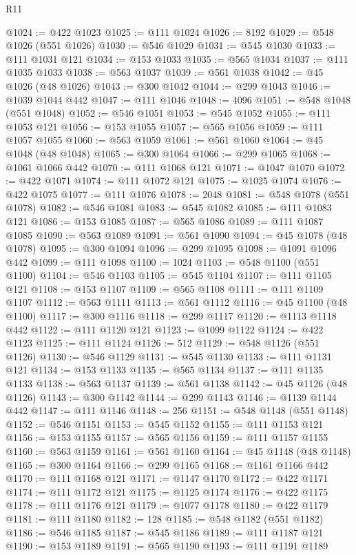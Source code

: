 \begin{lexlean}{R11}
\begin{coremodule}
@1024 := @422 @1023
@1025 := @111 @1024
@1026 := 8192
@1029 := @548 @1026 (@551 @1026)
@1030 := @546 @1029
@1031 := @545 @1030
@1033 := @111 @1031 @121
@1034 := @153 @1033
@1035 := @565 @1034
@1037 := @111 @1035 @1033
@1038 := @563 @1037
@1039 := @561 @1038
@1042 := @45 @1026 (@48 @1026)
@1043 := @300 @1042
@1044 := @299 @1043
@1046 := @1039 @1044 @442
@1047 := @111 @1046
@1048 := 4096
@1051 := @548 @1048 (@551 @1048)
@1052 := @546 @1051
@1053 := @545 @1052
@1055 := @111 @1053 @121
@1056 := @153 @1055
@1057 := @565 @1056
@1059 := @111 @1057 @1055
@1060 := @563 @1059
@1061 := @561 @1060
@1064 := @45 @1048 (@48 @1048)
@1065 := @300 @1064
@1066 := @299 @1065
@1068 := @1061 @1066 @442
@1070 := @111 @1068 @121
@1071 := @1047 @1070
@1072 := @422 @1071
@1074 := @111 @1072 @121
@1075 := @1025 @1074
@1076 := @422 @1075
@1077 := @111 @1076
@1078 := 2048
@1081 := @548 @1078 (@551 @1078)
@1082 := @546 @1081
@1083 := @545 @1082
@1085 := @111 @1083 @121
@1086 := @153 @1085
@1087 := @565 @1086
@1089 := @111 @1087 @1085
@1090 := @563 @1089
@1091 := @561 @1090
@1094 := @45 @1078 (@48 @1078)
@1095 := @300 @1094
@1096 := @299 @1095
@1098 := @1091 @1096 @442
@1099 := @111 @1098
@1100 := 1024
@1103 := @548 @1100 (@551 @1100)
@1104 := @546 @1103
@1105 := @545 @1104
@1107 := @111 @1105 @121
@1108 := @153 @1107
@1109 := @565 @1108
@1111 := @111 @1109 @1107
@1112 := @563 @1111
@1113 := @561 @1112
@1116 := @45 @1100 (@48 @1100)
@1117 := @300 @1116
@1118 := @299 @1117
@1120 := @1113 @1118 @442
@1122 := @111 @1120 @121
@1123 := @1099 @1122
@1124 := @422 @1123
@1125 := @111 @1124
@1126 := 512
@1129 := @548 @1126 (@551 @1126)
@1130 := @546 @1129
@1131 := @545 @1130
@1133 := @111 @1131 @121
@1134 := @153 @1133
@1135 := @565 @1134
@1137 := @111 @1135 @1133
@1138 := @563 @1137
@1139 := @561 @1138
@1142 := @45 @1126 (@48 @1126)
@1143 := @300 @1142
@1144 := @299 @1143
@1146 := @1139 @1144 @442
@1147 := @111 @1146
@1148 := 256
@1151 := @548 @1148 (@551 @1148)
@1152 := @546 @1151
@1153 := @545 @1152
@1155 := @111 @1153 @121
@1156 := @153 @1155
@1157 := @565 @1156
@1159 := @111 @1157 @1155
@1160 := @563 @1159
@1161 := @561 @1160
@1164 := @45 @1148 (@48 @1148)
@1165 := @300 @1164
@1166 := @299 @1165
@1168 := @1161 @1166 @442
@1170 := @111 @1168 @121
@1171 := @1147 @1170
@1172 := @422 @1171
@1174 := @111 @1172 @121
@1175 := @1125 @1174
@1176 := @422 @1175
@1178 := @111 @1176 @121
@1179 := @1077 @1178
@1180 := @422 @1179
@1181 := @111 @1180
@1182 := 128
@1185 := @548 @1182 (@551 @1182)
@1186 := @546 @1185
@1187 := @545 @1186
@1189 := @111 @1187 @121
@1190 := @153 @1189
@1191 := @565 @1190
@1193 := @111 @1191 @1189

\end{coremodule}
\end{lexlean}
